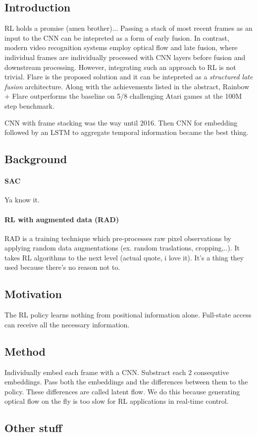 \documentclass{article}
\begin{document}
\subsection{Introduction}
RL holds a promise (amen brother)...
Passing a stack of most recent frames as an input to the CNN can be intepreted
as a form of early fusion.
In contrast, modern video recognition systems employ optical flow and late fusion,
where individual frames are individually processed with CNN layers before fusion and
downstream processing.
However, integrating such an approach to RL is not trivial.
Flare is the proposed solution and it can be intepreted as a \textit{structured late fusion} architecture.
Along with the achievements listed in the abstract,
Rainbow + Flare outperforms the baseline on 5/8 challenging Atari games at the 100M step benchmark.

CNN with frame stacking was the way until 2016.
Then CNN for embedding followed by an LSTM to aggregate temporal information became the best thing.

\subsection{Background}
\paragraph{SAC} Ya know it.

\paragraph{RL with augmented data (RAD)}
RAD is a training technique which pre-processes raw pixel observations by applying random data augmentations (ex.
random traslations, cropping,..). It takes RL algorithms to the next level (actual quote, i love it).
It's a thing they used because there's no reason not to.


\subsection{Motivation}
The RL policy learns nothing from positional information alone.
Full-state access can receive all the necessary information.

\subsection{Method}
Individually embed each frame with a CNN.
Substract each 2 consequtive embeddings. Pass both the embeddings
and the differences between them to the policy.
These differences are called latent flow.
We do this because generating optical flow on the fly is too slow
for RL applications in real-time control.

\subsection{Other stuff}
\end{document}
